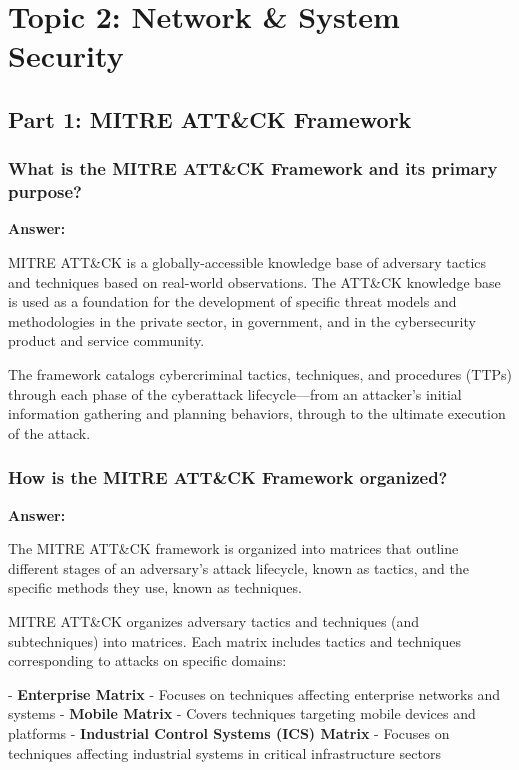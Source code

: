 \documentclass[12pt,a4paper]{article}
\begin{document}
\section{Topic 2: Network \& System Security}

\subsection{Part 1: MITRE ATT\&CK Framework}

\subsubsection{What is the MITRE ATT\&CK Framework and its primary purpose?}

\textbf{Answer:}

MITRE ATT\&CK is a globally-accessible knowledge base of adversary tactics and techniques based on real-world observations.  The ATT\&CK knowledge base is used as a foundation for the development of specific threat models and methodologies in the private sector, in government, and in the cybersecurity product and service community. 

The framework catalogs cybercriminal tactics, techniques, and procedures (TTPs) through each phase of the cyberattack lifecycle—from an attacker's initial information gathering and planning behaviors, through to the ultimate execution of the attack. 

\subsubsection{How is the MITRE ATT\&CK Framework organized?}

\textbf{Answer:}

The MITRE ATT\&CK framework is organized into matrices that outline different stages of an adversary's attack lifecycle, known as tactics, and the specific methods they use, known as techniques. 

MITRE ATT\&CK organizes adversary tactics and techniques (and subtechniques) into matrices. Each matrix includes tactics and techniques corresponding to attacks on specific domains: 

- \textbf{Enterprise Matrix} - Focuses on techniques affecting enterprise networks and systems
- \textbf{Mobile Matrix} - Covers techniques targeting mobile devices and platforms
- \textbf{Industrial Control Systems (ICS) Matrix} - Focuses on techniques affecting industrial systems in critical infrastructure sectors
\end{document}
